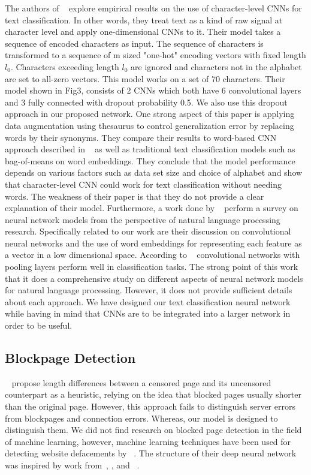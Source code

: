 \documentclass{article} %
\begin{document}
The authors of ~\cite{nips_text} explore empirical results on the use of character-level CNNs for text classification. In other words, they treat text as a kind of raw signal at character level and apply one-dimensional CNNs to it. Their model takes a sequence of encoded characters as input. The sequence of characters is transformed to a sequence of m sized "one-hot" encoding vectors with fixed length $l_0$. Characters exceeding length $l_0$ are ignored and characters not in the alphabet are set to all-zero vectors. This model works on a set of 70 characters. Their model shown in Fig3, consists of 2 CNNs which both have 6 convolutional layers and 3 fully connected with dropout probability 0.5. We also use this dropout approach in our proposed network. One strong aspect of this paper is applying data augmentation using thesaurus to control generalization error by replacing words by their synonyms. They compare their results to word-based CNN approach described in ~\cite{convtext} as well as traditional text classification models such as bag-of-means on word embeddings. They conclude that the model performance depends on various factors such as data set size and choice of alphabet and show that character-level CNN could work for text classification without needing words. The weakness of their paper is that they do not provide a clear explanation of their model.
Furthermore, a work done by ~\cite{nn_survery}  perform a survey on neural network models from the perspective of natural language processing research. Specifically related to our work are their discussion on convolutional neural networks and the use of word embeddings for representing each feature as a vector in a low dimensional space. According to ~\cite{} convolutional networks with pooling layers perform well in classification tasks. The strong point of this work that it does a comprehensive study on different aspects of neural network models for natural language processing. However, it does not provide sufficient details about each approach. We have designed our text classification neural network while having in mind that  CNNs are to be integrated into a larger network in order to be useful.
\subsection{Blockpage Detection}
~\parencite{imc14_phillipa} propose length differences between a censored page and its uncensored counterpart as a heuristic, 
relying on the idea that blocked pages usually shorter than the original page. However, this approach fails to distinguish server errors from blockpages and connection errors. Whereas, our model is designed to distinguish them.
We did not find research on blocked page detection in the field of machine learning, however, machine learning techniques have been used for detecting website defacements by ~\parencite{meerkat}. The structure of their deep neural network was inspired by work from~\parencite{imagehinton}, \parencite{nipsandrewng}, and ~\parencite{icml_unsupervised}.
\end{document}
